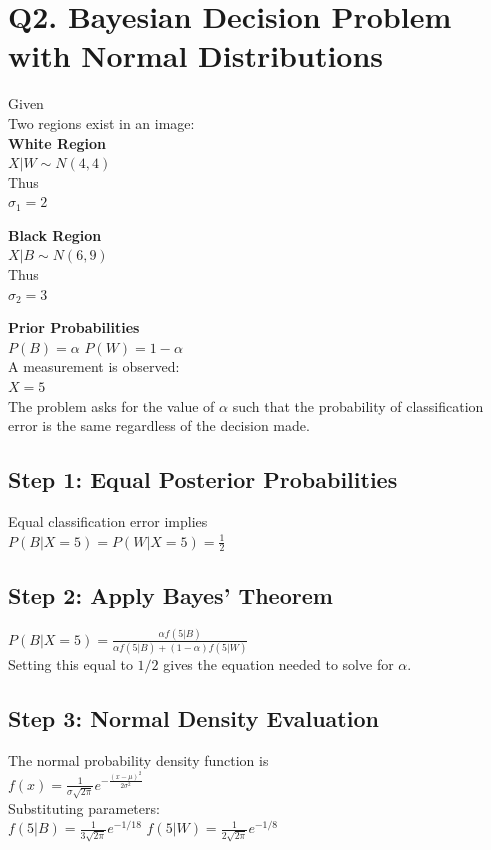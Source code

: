 \documentclass{article}
\begin{document}
\section{Q2. Bayesian Decision Problem with Normal Distributions}
Given \\
Two regions exist in an image: \\
\textbf{White Region} \\
$X|W \sim N(4,4)$ \\
Thus \\
$\sigma_1 = 2$

\textbf{Black Region} \\
$X|B \sim N(6,9)$ \\
Thus \\
$\sigma_2 = 3$

\textbf{Prior Probabilities} \\
$P(B) = \alpha$ \quad $P(W) = 1 - \alpha$ \\
A measurement is observed: \\
$X = 5$ \\
The problem asks for the value of $\alpha$ such that the probability of classification error is the same regardless of the decision made.

\subsection{Step 1: Equal Posterior Probabilities}
Equal classification error implies \\
$P(B|X=5) = P(W|X=5) = \frac{1}{2}$

\subsection{Step 2: Apply Bayes' Theorem}
$P(B|X=5)= \frac{\alpha f(5|B)} {\alpha f(5|B)+(1-\alpha)f(5|W)}$ \\
Setting this equal to $1/2$ gives the equation needed to solve for $\alpha$.

\subsection{Step 3: Normal Density Evaluation}
The normal probability density function is \\
$f(x)=\frac{1}{\sigma\sqrt{2\pi}}e^{-\frac{(x-\mu)^2}{2\sigma^2}}$ \\
Substituting parameters: \\
$f(5|B)=\frac{1}{3\sqrt{2\pi}}e^{-1/18}$ \quad $f(5|W)=\frac{1}{2\sqrt{2\pi}}e^{-1/8}$
\end{document}
